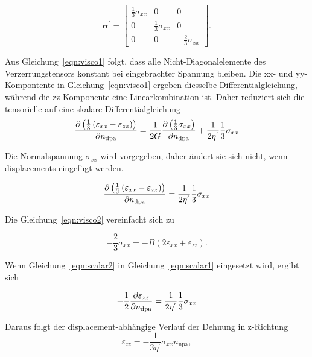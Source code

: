 \documentclass[a4paper, 10pt, 
               numbers=noenddot, toc=graduated,
               headsepline=true, footsepline=true,
               twoside=false, titlepage=true, 
               bibliography=totoc]{scrartcl}
\newcommand{\refeqn}[1]  {Gleichung~\ref{#1}}
\begin{document}
		\begin{equation}
	  \bm{\sigma}^{'}  = \begin{bmatrix}
     \frac{1}{3} \sigma_{xx}     & 0 & 0 \\
     0 & \frac{1}{3} \sigma_{xx}     & 0  \\
    0 &  0 &  - \frac{2}{3} \sigma_{xx} 
\end{bmatrix}.
	\end{equation}
	
	Aus \refeqn{eqn:visco1} folgt, dass alle Nicht-Diagonalelemente des Verzerrungstensors konstant bei eingebrachter Spannung bleiben. Die xx- und yy-Kompontente in \refeqn{eqn:visco1} ergeben diesselbe Differentialgleichung, während die zz-Komponente eine Linearkombination ist. Daher reduziert sich die tensorielle auf eine skalare Differentialgleichung
	\begin{equation}
	 \pdv{  \left(\frac{1}{3} \left( \varepsilon_{xx} - \varepsilon_{zz} \right) \right) }{n_\mathrm{dpa} } = \frac{1}{2G} \pdv{ \left( \frac{1}{3} \sigma_{xx} \right)}{n_\mathrm{dpa}} + \frac{1}{2\eta^{'} }  \frac{1}{3} \sigma_{xx}
	\end{equation}
	
    Die Normalspannung $\sigma_{xx}$ wird vorgegeben, daher ändert sie sich nicht, wenn displacements eingefügt werden.
    
    	\begin{equation}\label{eqn:scalar1}
	 \pdv{  \left(\frac{1}{3} \left( \varepsilon_{xx} - \varepsilon_{zz} \right) \right) }{n_\mathrm{dpa} } = \frac{1}{2\eta^{'} }  \frac{1}{3} \sigma_{xx}
	\end{equation}
	
	Die \refeqn{eqn:visco2} vereinfacht sich zu
	
	\begin{equation}\label{eqn:scalar2}
	  -\frac{2}{3} \sigma_{xx} = - B \left( 2 \varepsilon_{xx} + \varepsilon_{zz} \right).
	\end{equation}
	
	Wenn \refeqn{eqn:scalar2} in \refeqn{eqn:scalar1} eingesetzt wird, ergibt sich
	
	\begin{equation}
	  - \frac{1}{2} \pdv{  \varepsilon_{zz} }{n_\mathrm{dpa} } = \frac{1}{2\eta^{'} }  \frac{1}{3} \sigma_{xx}
	\end{equation}
	
	Daraus folgt der displacement-abhängige Verlauf der Dehnung in z-Richtung
	\begin{equation}
	  \boxed{ \varepsilon_{zz} = -  \frac{1}{3\eta^{'} }  \sigma_{xx} n_\mathrm{npa},}
	\end{equation}
 	
\end{document}
